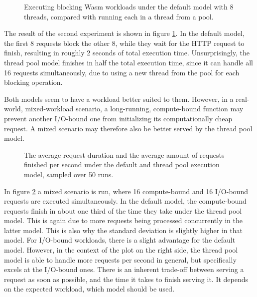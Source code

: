 \begin{figure}
    \begin{center}
        
    \end{center}
    \caption{Executing blocking Wasm workloads under the  default model with 8 threads, compared with running each in a thread from a pool.}
    \label{fig:default_vs_thread_pool}
\end{figure}

The result of the second experiment is shown in figure \ref{fig:default_vs_thread_pool}. In the default model, the first 8 requests block the other 8, while they wait for the HTTP request to finish, resulting in roughly 2 seconds of total execution time. Unsurprisingly, the thread pool model finishes in half the total execution time, since it can handle all 16 requests simultaneously, due to using a new thread from the pool for each blocking operation.

Both models seem to have a workload better suited to them. However, in a real-world, mixed-workload scenario, a long-running, compute-bound function may prevent another I/O-bound one from initializing its computationally cheap request. A mixed scenario may therefore also be better served by the thread pool model.

\begin{figure}
    \begin{center}
        
    \end{center}
    \caption{The average request duration and the average amount of requests finished per second under the default and thread pool execution model, sampled over 50 runs.}
    \label{fig:default_vs_thread_pool_mixed}
\end{figure}

In figure \ref{fig:default_vs_thread_pool_mixed} a mixed scenario is run, where 16 compute-bound and 16 I/O-bound requests are executed simultaneously. In the default model, the compute-bound requests finish in about one third of the time they take under the thread pool model. This is again due to more requests being processed concurrently in the latter model. This is also why the standard deviation is slightly higher in that model. For I/O-bound workloads, there is a slight advantage for the default model. However, in the context of the plot on the right side, the thread pool model is able to handle more requests per second in general, but specifically excels at the I/O-bound ones. There is an inherent trade-off between serving a request as soon as possible, and the time it takes to finish serving it. It depends on the expected workload, which model should be used.

